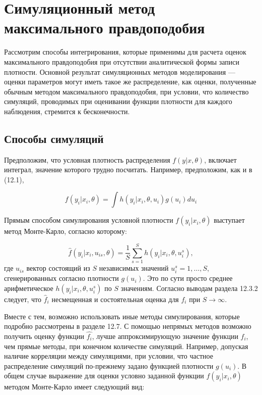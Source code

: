 \section{Симуляционный метод максимального правдоподобия}

Рассмотрим способы интегрирования, которые применимы для расчета оценок максимального правдоподобия при отсутствии аналитической формы записи плотности. Основной результат симуляционных методов моделирования --- оценки параметров могут иметь такое же распределение, как оценки, полученные обычным методом максимального правдоподобия, при условии, что количество симуляций, проводимых при оценивании функции плотности для каждого наблюдения, стремится к бесконечности.

\subsection{Способы симуляций}

Предположим, что условная плотность распределения $f(y|x,\theta)$, включает интеграл, значение которого трудно посчитать. Например, предположим, как и в (12.1),

\begin{equation}
f(y_i|x_i,\theta)=\int{h(y_i|x_i,\theta,u_i)g(u_i)du_i}
\end{equation}

Прямым способом симулирования условной плотности $f(y_i|x_i,\theta)$ выступает метод Монте-Карло, согласно которому:

\begin{equation}
\hat{f}(y_i|x_i,u_{is},\theta)=\dfrac{1}{S}\sum^{S}_{s=1}h(y_i|x_i, \theta, u^{s}_i),
\end{equation}
где $u_{is}$ вектор состоящий из $S$ независимых значений $u^{s}_{i}=1,\ldots ,S$, сгенерированных согласно плотности $g(u_i)$. Это по сути просто среднее арифметическое $h(y_i|x_i, \theta, u^{s}_{i})$ по $S$ значениям. Согласно выводам раздела 12.3.2 следует, что $\hat{f}_i$ несмещенная и состоятельная оценка для $f_i$ при $S \rightarrow \infty$.

Вместе с тем, возможно использовать иные методы симулирования, которые подробно рассмотрены в разделе 12.7. С помощью непрямых методов возможно получить оценку функции $\hat{f_i}$, лучше аппроксимирующую значение функции $f_i$, чем прямые методы, при конечном количестве симуляций. Например, допуская наличие корреляции между симуляциями, при условии, что частное распределение симуляций по-прежнему задано функцией плотности $g(u_i)$. В общем случае выражение для оценки условно заданной функции $f(y_i|x_i,\theta)$ методом Монте-Карло имеет следующий вид:

